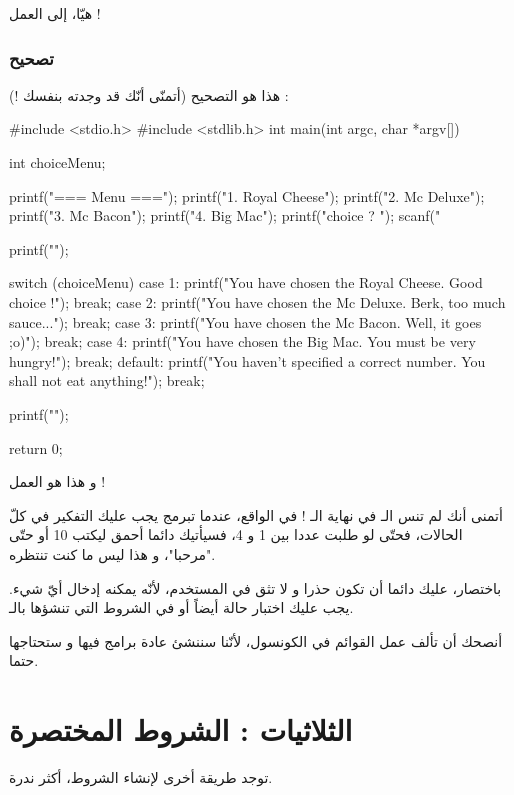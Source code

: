 هيّا، إلى العمل !

\subsubsection{تصحيح}

هذا هو التصحيح (أتمنّى أنّك قد وجدته بنفسك !) :

\begin{Csource}
#include <stdio.h>
#include <stdlib.h>
int main(int argc, char *argv[])
{
	int choiceMenu;
	
	printf("=== Menu ===\n\n");
	printf("1. Royal Cheese\n");
	printf("2. Mc Deluxe\n");
	printf("3. Mc Bacon\n");
	printf("4. Big Mac\n");
	printf("\nYour choice ? ");
	scanf("%
	
	printf("\n");
	
	switch (choiceMenu)
	{
		case 1:
		printf("You have chosen the Royal Cheese. Good choice !");
		break;
		case 2:
		printf("You have chosen the Mc Deluxe. Berk, too much sauce...");
		break;
		case 3:
		printf("You have chosen the Mc Bacon. Well, it goes ;o)");
		break;
		case 4:
		printf("You have chosen the Big Mac. You must be very hungry!");
		break;
		default:
		printf("You haven't specified a correct number. You shall not eat anything!");
		break;
	}
	
	printf("\n\n");
	
	return 0;
}
\end{Csource}
و هذا هو العمل !

أتمنى أنك لم تنس الـ
 في نهاية الـ !
في الواقع، عندما تبرمج يجب عليك التفكير في كلّ الحالات،  فحتّى لو طلبت عددا بين 1 و 4، فسيأتيك دائما أحمق ليكتب 10 أو حتّى "مرحبا"،  و هذا ليس ما كنت تنتظره. 

باختصار، عليك دائما أن تكون حذرا و لا تثق في المستخدم، لأنّه يمكنه إدخال أيّ شيء. يجب عليك اختبار حالة
أيضاً أو 
في الشروط التي تنشؤها بالـ.

\begin{information}
أنصحك أن تألف عمل القوائم في الكونسول، لأنّنا سننشئ عادة برامج فيها و ستحتاجها حتما.
\end{information}

\section{الثلاثيات : الشروط المختصرة}

توجد طريقة أخرى لإنشاء الشروط، أكثر ندرة.

